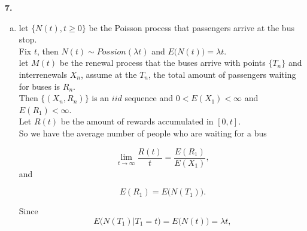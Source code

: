 \documentclass{amsart}
\theoremstyle{plain}
\theoremstyle{definition}
\begin{document}
\vspace{5mm}
\noindent \textbf{7.}
\begin{enumerate}[(a)]
	\item
	let $\{N(t), t\geq 0\}$ be the Poisson process that passengers arrive at the bus stop.\\
	Fix $t$, then $N(t) \sim Possion(\lambda t)$ and $E\big(N(t)\big) = \lambda t$.\\
	let $M(t)$ be the renewal process that the buses arrive with points $\{T_n\}$ and interrenewals $X_n$, assume at the $T_n$, the total amount of passengers waiting for buses is $R_n$. \\
	Then $\{(X_n,R_n)\}$ is an $iid$ sequence and $0<E(X_1) < \infty$ and $E(R_1) < \infty$.\\
	Let $R(t)$ be the amount of rewards accumulated in $[0,t]$.\\
	So we have the average number of people who are waiting for a bus

	\[\lim_{t\to \infty} \frac{R(t)}{t} = \frac{E(R_1)}{E(X_1)},\]
	and 

	\[E(R_1) = E\big( N(T_1)\big).\]

	Since 
	\[E\big(N(T_1)|T_1= t\big) = E\big(N(t)\big) = \lambda t,\]


\end{enumerate}
\end{document}
